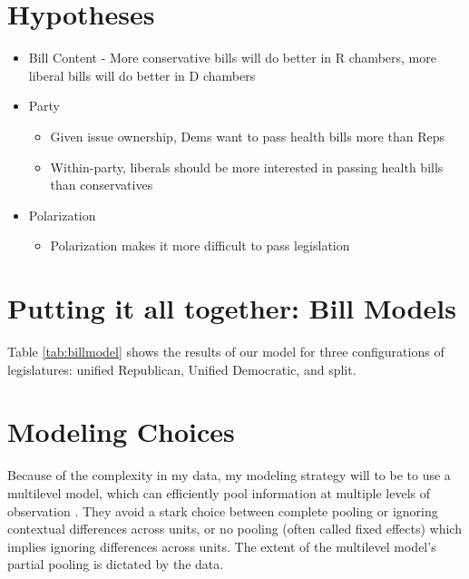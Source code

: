 \documentclass[
  oneside]{book}
\providecommand{\tightlist}{%
  \setlength{\itemsep}{0pt}\setlength{\parskip}{0pt}}
\begin{document}
\hypertarget{hypotheses}{%
\section{Hypotheses}\label{hypotheses}}

\begin{itemize}
\tightlist
\item
  Bill Content
  - More conservative bills will do better in R chambers, more liberal bills will do better in D chambers
\item
  Party

  \begin{itemize}
  \tightlist
  \item
    Given issue ownership, Dems want to pass health bills more than Reps
  \item
    Within-party, liberals should be more interested in passing health bills than conservatives
  \end{itemize}
\item
  Polarization

  \begin{itemize}
  \tightlist
  \item
    Polarization makes it more difficult to pass legislation
  \end{itemize}
\end{itemize}

\hypertarget{putting-it-all-together-bill-models}{%
\section{Putting it all together: Bill Models}\label{putting-it-all-together-bill-models}}

Table \ref{tab:billmodel} shows the results of our model for three configurations of legislatures: unified Republican, Unified Democratic, and split.

\hypertarget{modeling-choices}{%
\section{Modeling Choices}\label{modeling-choices}}

Because of the complexity in my data, my modeling strategy will to be to use a multilevel model, which can efficiently pool information at multiple levels of observation \citep{Raudenbush:2002, Gelman:2006}. They avoid a stark choice between complete pooling or ignoring contextual differences across units, or no pooling (often called fixed effects) which implies ignoring differences across units. The extent of the multilevel model's partial pooling is dictated by the data.
\end{document}
